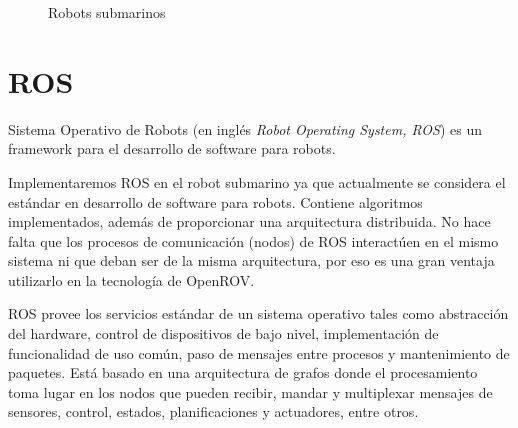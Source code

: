 \begin{figure}[hbtp]
  \begin{center}
  \end{center}
  \caption{Robots submarinos}
  \label{fig:submarino}
\end{figure}
  
\section{ROS}
\label{cap:ROS}

Sistema Operativo de Robots (en inglés \textit{Robot Operating System, ROS}\cite{ros}) es un framework para el desarrollo de software para robots. 

Implementaremos ROS en el robot submarino ya que actualmente se considera el estándar en desarrollo de software para robots. Contiene algoritmos implementados, además de proporcionar una arquitectura distribuida. No hace falta que los procesos de comunicación (nodos) de ROS interactúen en el mismo sistema ni que deban ser de la misma arquitectura, por eso es una gran ventaja utilizarlo en la tecnología de OpenROV. 

ROS provee los servicios estándar de un sistema operativo tales como abstracción del hardware, control de dispositivos de bajo nivel, implementación de funcionalidad de uso común, paso de mensajes entre procesos y mantenimiento de paquetes. Está basado en una arquitectura de grafos donde el procesamiento toma lugar en los nodos que pueden recibir, mandar y multiplexar mensajes de sensores, control, estados, planificaciones y actuadores, entre otros.

